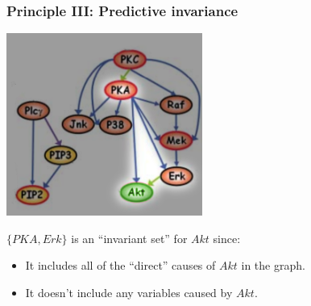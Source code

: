 \documentclass{beamer}
\begin{document}
\begin{frame}
\frametitle{Principle III: Predictive invariance}
\begin{center}
\includegraphics[scale = 0.5]{../images/fig04_01.png}
\end{center}

$\{PKA, Erk\}$ is an ``invariant set'' for $Akt$ since:

\begin{itemize}
\item It includes all of the ``direct'' causes of $Akt$ in the graph.
\item It doesn't include any variables caused by $Akt$.
\end{itemize}

\end{frame}
\end{document}
